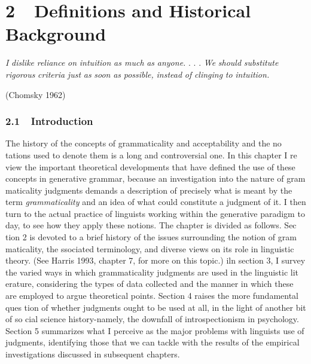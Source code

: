 \clearpage\setcounter{page}{1}\section[2\ \ Definitions and Historical Background]{2\ \ Definitions and Historical Background}
\begin{styleStandard}
\textit{I}\textit{ }\textit{dislike}\textit{ }\textit{reliance}\textit{ }\textit{on}\textit{ }\textit{intuition}\textit{ }\textit{as much}\textit{ }\textit{as}\textit{ }\textit{anyone}\textit{.}\textit{ }. . . \textit{We}\textit{ }\textit{should}\textit{ }\textit{substitute}\textit{ }\textit{rigorous}\textit{ }\textit{criteria}\textit{ }\textit{just}\textit{ }\textit{as}\textit{ }\textit{soon}\textit{ }\textit{as}\textit{ }\textit{possible,}\textit{ }\textit{instead}\textit{ }\textit{of}\textit{ }\textit{clinging}\textit{ }\textit{to}\textit{ }\textit{intuition.}
\end{styleStandard}


\begin{styleStandard}
(Chomsky 1962)
\end{styleStandard}


\subsubsection[2.1\ \ Introduction]{2.1\ \ Introduction}
\begin{styleStandard}
The history of the concepts of grammaticality and acceptability and the no\- tations used to denote them is a long and controversial one. In this chapter I re\- view the important theoretical developments that have defined the use of these concepts in generative grammar, because an investigation into the nature of gram\- maticality judgments demands a description of precisely what is meant by the term \textit{grammaticality}\textit{ }and an idea of what could constitute a judgment of it. I then turn to the actual practice of linguists working within the generative paradigm to\- day, to see how they apply these notions. The chapter is divided as follows. Sec\- tion 2 is devoted to a brief history of the issues surrounding the notion of gram\- maticality, the ssociated terminology, and diverse views on its role in linguistic theory. (See Harris 1993, chapter 7, for more on this topic.) iln section 3, I survey the varied ways in which grammaticality judgments are used in the linguistic lit\- erature, considering the types of data collected and the manner in which these are employed to argue theoretical points. Section 4 raises the more fundamental ques\- tion of whether judgments ought to be used at all, in the light of another bit of so\- cial science history-namely, the downfall of introspectionism in psychology. Section 5 summarizes what I perceive as the major problems with linguists{\textquotesingle} use of judgments, identifying those that we can tackle with the results of the empirical investigations discussed in subsequent chapters.
\end{styleStandard}


